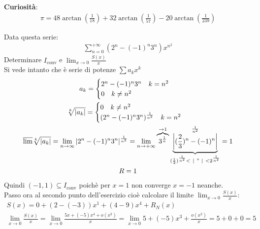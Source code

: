 \documentclass[a4paper, oneside]{article}
\begin{document}
\textbf{Curiosità}:
\begin{gather*}
  \pi = 48 \arctan(\frac{1}{18}) + 32 \arctan(\frac{1}{57}) - 20 \arctan(\frac{1}{239})
\end{gather*}

\begin{example}
  Data questa serie:
  \begin{gather*}
    \sum_{n=0}^{+\infty} (2^n - (-1)^n3^n) x^{n^2}
  \end{gather*}
  Determinare $I_\text{conv}$ e $\lim_{x \to 0} \frac{S(x)}{x}$\\
  Si vede intanto che è serie di potenze $\sum a_k x^k$
  \begin{gather*}
    a_k = \begin{cases}
      2^n - (-1)^n 3^n \quad k = n^2\\
      0 \quad k \neq n^2
    \end{cases} \\
    \sqrt[k]{|a_k|} = \begin{cases}
      0 \quad k \neq n^2\\
      (2^n - (-1)^n 3^n)^{\frac{1}{n^2}} \quad k = n^2
    \end{cases} \\
    \overline{\lim} \sqrt[k]{|a_k|} = \lim_{n \to \infty} \left\lvert 2^n - (-1)^n 3^n\right\rvert ^{\frac{1}{n^2}} = \lim_{n \to +\infty} \overbrace{3^{\frac{1}{n}}}^{\to 1} \underbrace{\left\lvert (\frac{2}{3})^n - (-1)^n \right\rvert}_{(\frac{1}{2})^{\frac{1}{n^2}} < \ |\ "\ | \ < 2^{\frac{1}{n^2}}}^{\frac{1}{n^2}} = 1 \\
    R = 1
  \end{gather*}
  Quindi $(-1,1) \subseteq I_\text{conv}$ poichè per $x=1$ non converge $x=-1$ neanche.\\
  Passo ora al secondo punto dell'esercizio cioè calcolare il limite $ \lim_{x \to 0} \frac{S(x)}{x}$:
  \begin{gather*}
    S(x) = 0 + (2 - (-3)) x^{1} + (4 - 9) x^{4} + R_N(x)\\
    \lim_{x \to 0} \frac{S(x)}{x} = \lim_{x \to 0} \frac{5x + (-5)x^4 + o(x^2)}{x} = \lim_{x \to 0} 5 + (-5)x^3 + \frac{o(x^2)}{x} = 5 + 0 + 0 = 5 \\
  \end{gather*}
\end{example}
\end{document}
